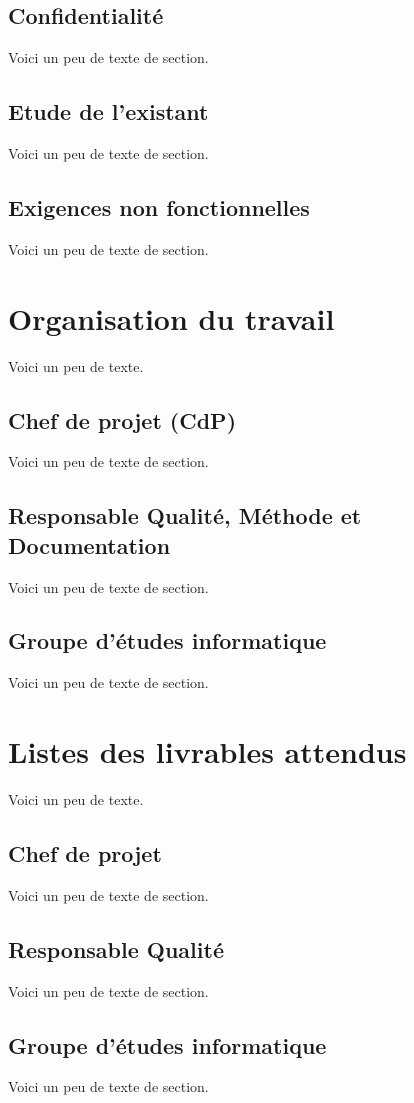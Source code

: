     \section{Confidentialité}
    Voici un peu de texte de section.
    \section{Etude de l'existant}
    Voici un peu de texte de section.
    \section{Exigences non fonctionnelles}
    Voici un peu de texte de section.
    
    \chapter{Organisation du travail}
    Voici un peu de texte.
    \section{Chef de projet (CdP)}
    Voici un peu de texte de section.
    \section{Responsable Qualité, Méthode et Documentation}
    Voici un peu de texte de section.
    \section{Groupe d'études informatique}
    Voici un peu de texte de section.
    
    \chapter{Listes des livrables attendus}
    Voici un peu de texte.
    \section{Chef de projet}
    Voici un peu de texte de section.
    \section{Responsable Qualité}
    Voici un peu de texte de section.
    \section{Groupe d'études informatique}
    Voici un peu de texte de section.
    
